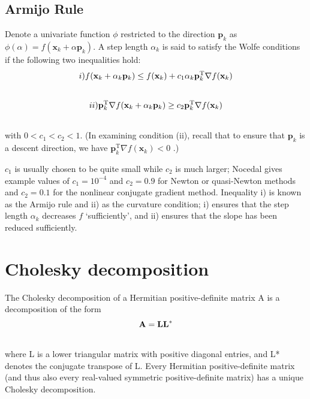 \documentclass[letterpaper,10pt,english]{sphinxmanual}
\begin{document}
\subsection{Armijo Rule}
\label{theory:armijo-rule}
Denote a univariate function $\phi$ restricted to the direction
$\mathbf{p}_k$ as $\phi(\alpha)=f(\mathbf{x}_k+\alpha\mathbf{p}_k)$.
A step length $\alpha_k$ is said to satisfy the Wolfe conditions if the
following two inequalities hold:
\begin{gather}
\begin{split}i) f(\mathbf{x}_k+\alpha_k\mathbf{p}_k)\leq
   f(\mathbf{x}_k)+c_1\alpha_k\mathbf{p}_k^{\mathrm T}\nabla
   f(\mathbf{x}_k)\end{split}\notag\\\begin{split}\end{split}\notag
\end{gather}\begin{gather}
\begin{split}ii) \mathbf{p}_k^{\mathrm T}\nabla f(\mathbf{x}_k+\alpha_k\mathbf{p}_k)
    \geq c_2\mathbf{p}_k^{\mathrm T}\nabla f(\mathbf{x}_k)\end{split}\notag\\\begin{split}\end{split}\notag
\end{gather}
with $0<c_1<c_2<1$. (In examining condition (ii), recall that to ensure
that $\mathbf{p}_k$ is a descent direction, we have
$\mathbf{p}_k^{\mathrm T}\nabla f(\mathbf{x}_k) < 0$ .)

$c_1$ is usually chosen to be quite small while $c_2$ is much
larger; Nocedal gives example values of $c_1=10^{-4}$ and
$c_2=0.9$ for Newton or quasi-Newton methods and $c_2=0.1$ for the
nonlinear conjugate gradient method. Inequality i) is known as the Armijo rule
and ii) as the curvature condition; i) ensures that the step length
$\alpha_k$ decreases $f$ `sufficiently', and ii) ensures that the
slope has been reduced sufficiently.


\section{Cholesky decomposition}
\label{theory:cholesky-decomposition}
The Cholesky decomposition of a Hermitian positive-definite matrix A is a
decomposition of the form
\begin{gather}
\begin{split}\mathbf{A = L L}^{*}\end{split}\notag\\\begin{split}\end{split}\notag
\end{gather}
where L is a lower triangular matrix with positive diagonal entries, and L*
denotes the conjugate transpose of L. Every Hermitian positive-definite matrix
(and thus also every real-valued symmetric positive-definite matrix) has a
unique Cholesky decomposition.
\end{document}
